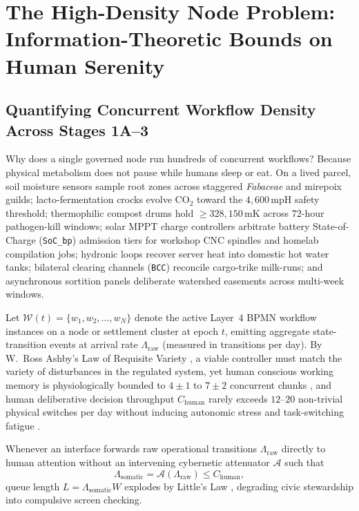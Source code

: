\section{The High-Density Node Problem: Information-Theoretic Bounds on Human Serenity}
\label{sec:high-density-problem}

\subsection{Quantifying Concurrent Workflow Density Across Stages 1A--3}

Why does a single governed node run hundreds of concurrent workflows? Because physical metabolism does not pause while humans sleep or eat. On a lived parcel, soil moisture sensors sample root zones across staggered \textit{Fabaceae} and mirepoix guilds; lacto-fermentation crocks evolve $\mathrm{CO}_2$ toward the $4{,}600\,\mathrm{mpH}$ safety threshold; thermophilic compost drums hold $\ge 328{,}150\,\mathrm{mK}$ across $72$-hour pathogen-kill windows; solar MPPT charge controllers arbitrate battery State-of-Charge (\texttt{SoC\_bp}) admission tiers for workshop CNC spindles and homelab compilation jobs; hydronic loops recover server heat into domestic hot water tanks; bilateral clearing channels (\texttt{BCC}) reconcile cargo-trike milk-runs; and asynchronous sortition panels deliberate watershed easements across multi-week windows.

Let $\mathcal{W}(t) = \{w_1, w_2, \dots, w_N\}$ denote the active Layer~4 BPMN workflow instances on a node or settlement cluster at epoch $t$, emitting aggregate state-transition events at arrival rate $\Lambda_{\mathrm{raw}}$ (measured in transitions per day). By W.\ Ross Ashby's Law of Requisite Variety \parencite{ashby1956}, a viable controller must match the variety of disturbances in the regulated system, yet human conscious working memory is physiologically bounded to $4 \pm 1$ to $7 \pm 2$ concurrent chunks \parencite{miller1956magical,sweller1988cognitive}, and human deliberative decision throughput $C_{\mathrm{human}}$ rarely exceeds $12\text{--}20$ non-trivial physical switches per day without inducing autonomic stress and task-switching fatigue \parencite{little1961proof,han2015}.

Whenever an interface forwards raw operational transitions $\Lambda_{\mathrm{raw}}$ directly to human attention without an intervening cybernetic attenuator $\mathcal{A}$ such that
\begin{equation}
    \Lambda_{\mathrm{somatic}} = \mathcal{A}(\Lambda_{\mathrm{raw}}) \le C_{\mathrm{human}},
    \label{eq:ashby-attenuation-bound}
\end{equation}
queue length $L = \Lambda_{\mathrm{somatic}} W$ explodes by Little's Law \parencite{little1961proof}, degrading civic stewardship into compulsive screen checking.

